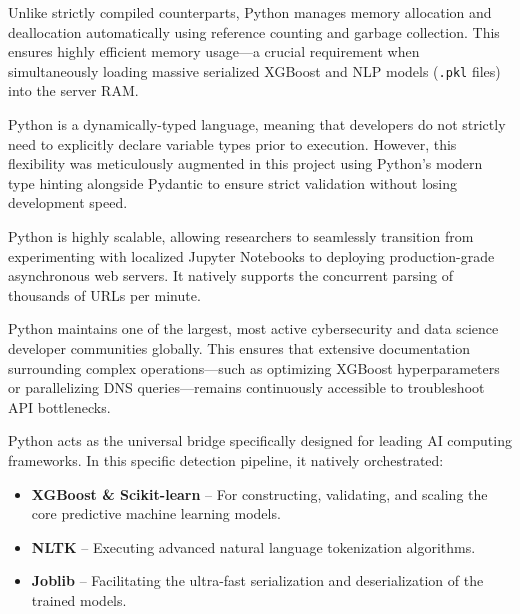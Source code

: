 
\noindent
Unlike strictly compiled counterparts, Python manages memory allocation and deallocation automatically using reference counting and garbage collection. This ensures highly efficient memory usage---a crucial requirement when simultaneously loading massive serialized XGBoost and NLP models (\texttt{.pkl} files) into the server RAM.


\noindent
Python is a dynamically-typed language, meaning that developers do not strictly need to explicitly declare variable types prior to execution. However, this flexibility was meticulously augmented in this project using Python's modern type hinting alongside Pydantic to ensure strict validation without losing development speed.


\noindent
Python is highly scalable, allowing researchers to seamlessly transition from experimenting with localized Jupyter Notebooks to deploying production-grade asynchronous web servers. It natively supports the concurrent parsing of thousands of URLs per minute.


\noindent
Python maintains one of the largest, most active cybersecurity and data science developer communities globally. This ensures that extensive documentation surrounding complex operations---such as optimizing XGBoost hyperparameters or parallelizing DNS queries---remains continuously accessible to troubleshoot API bottlenecks.


\noindent
Python acts as the universal bridge specifically designed for leading AI computing frameworks. In this specific detection pipeline, it natively orchestrated:

\begin{itemize}
\item \textbf{XGBoost \& Scikit-learn} -- For constructing, validating, and scaling the core predictive machine learning models.
\item \textbf{NLTK} -- Executing advanced natural language tokenization algorithms.
\item \textbf{Joblib} -- Facilitating the ultra-fast serialization and deserialization of the trained models.
\end{itemize}

